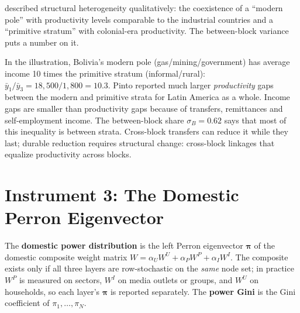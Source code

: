 \documentclass[../structural_economics_book.tex]{subfiles}
\begin{document}
\begin{prebisch}
\citet{pinto1970naturaleza} described structural heterogeneity qualitatively: the coexistence of a ``modern pole'' with productivity levels comparable to the industrial countries and a ``primitive stratum'' with colonial-era productivity. The between-block variance puts a number on it.

In the illustration, Bolivia's modern pole (gas/mining/government) has average income 10 times the primitive stratum (informal/rural): $\bar{y}_1/\bar{y}_3 = 18{,}500/1{,}800 = 10.3$. Pinto reported much larger \emph{productivity} gaps between the modern and primitive strata for Latin America as a whole. %
Income gaps are smaller than productivity gaps because of transfers, remittances and self-employment income. The between-block share $\sigma_B = 0.62$ says that most of this inequality is between strata. Cross-block transfers can reduce it while they last; durable reduction requires structural change: cross-block linkages that equalize productivity across blocks.
\end{prebisch}


\section{Instrument 3: The Domestic Perron Eigenvector}
\label{ch17:sec:perron}

\begin{definition}\label{ch17:def:domestic_pi}
The \textbf{domestic power distribution} is the left Perron eigenvector $\boldsymbol{\pi}$ of the domestic composite weight matrix $W = \alpha_U W^U + \alpha_P W^P + \alpha_I W^I$. The composite exists only if all three layers are row-stochastic on the \emph{same} node set; in practice $W^P$ is measured on sectors, $W^I$ on media outlets or groups, and $W^U$ on households, so each layer's $\boldsymbol{\pi}$ is reported separately. The \textbf{power Gini} is the Gini coefficient of $\pi_1, \ldots, \pi_N$.
\end{definition}
\end{document}
